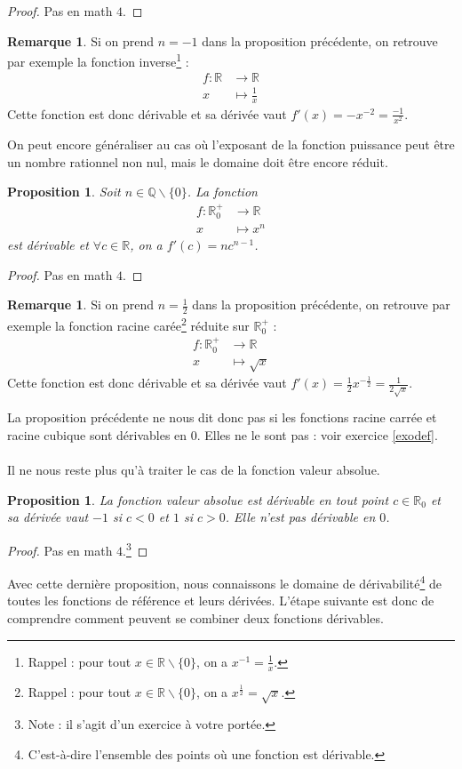 \documentclass[a4paper,fontsize=13pt]{scrreprt}
\theoremstyle{plain}
\newtheorem{pro}[subsection]{Proposition}
\theoremstyle{definition}
\newtheorem{rema}[subsection]{Remarque}
\newcommand{\qu}{\mathbb{Q}}
\newcommand{\rr}{\mathbb{R}}
\begin{document}
\begin{proof}
	Pas en math $4$.
\end{proof}
\begin{rema}
	Si on prend $n =-1$ dans la proposition précédente, on retrouve par exemple la fonction inverse\footnote{Rappel : pour tout $x \in \rr \backslash \{0\}$, on a $x^{-1}=\frac{1}{x}$.} :
	\begin{align*}
	f : \rr &\to \rr \\
	x &\mapsto \frac{1}{x}
	\end{align*}
	Cette fonction est donc dérivable et sa dérivée vaut $f'(x)=-x^{-2}=\frac{-1}{x^2}$.
\end{rema}
On peut encore généraliser au cas où l'exposant de la fonction puissance peut être un nombre rationnel non nul, mais le domaine doit être encore réduit.
\begin{pro}
	Soit $n \in \qu \backslash \{0\}$. La fonction
	\begin{align*}
	f : {\rr}^{+}_{0} &\to \rr \\
	x &\mapsto x^n
	\end{align*}
	est dérivable et $\forall c \in \rr$, on a $f'(c) = nc^{n-1}$.
\end{pro}
\begin{proof}
	Pas en math $4$.
\end{proof}
\begin{rema}
	Si on prend $n =\frac{1}{2}$ dans la proposition précédente, on retrouve par exemple la fonction racine carée\footnote{Rappel : pour tout $x \in \rr \backslash \{0\}$, on a $x^{\frac{1}{2}}=\sqrt{x}$.} réduite sur ${\rr}^{+}_{0}$ :
	\begin{align*}
	f : {\rr}^{+}_{0} &\to \rr \\
	x &\mapsto \sqrt{x}
	\end{align*}
	Cette fonction est donc dérivable et sa dérivée vaut $f'(x)=\frac{1}{2}x^{-\frac{1}{2}}=\frac{1}{2\sqrt{x}}$. \\
\end{rema}
La proposition précédente ne nous dit donc pas si les fonctions racine carrée et racine cubique sont dérivables en $0$. Elles ne le sont pas : voir exercice \ref{exodef}. \\
~~\\
Il ne nous reste plus qu'à traiter le cas de la fonction valeur absolue.
\begin{pro}
	La fonction valeur absolue est dérivable en tout point $c \in {\rr}_{0}$ et sa dérivée vaut $-1$ si $c < 0$ et $1$ si $c>0$. Elle n'est pas dérivable en $0$.
\end{pro}
\begin{proof}
	Pas en math $4$.\footnote{Note : il s'agit d'un exercice à votre portée.}
\end{proof}
Avec cette dernière proposition, nous connaissons le domaine de dérivabilité\footnote{C'est-à-dire l'ensemble des points où une fonction est dérivable.} de toutes les fonctions de référence et leurs dérivées. L'étape suivante est donc de comprendre comment peuvent se combiner deux fonctions dérivables.
\end{document}
